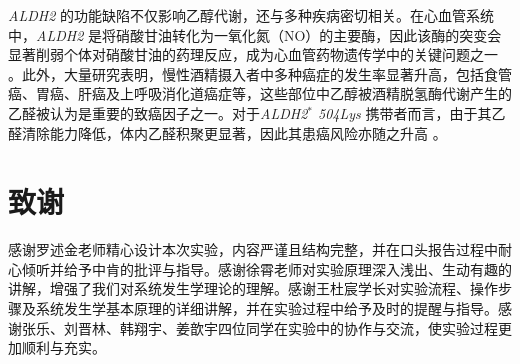 \documentclass[10pt]{article}
\begin{document}
\textit{ALDH2} 的功能缺陷不仅影响乙醇代谢，还与多种疾病密切相关。在心血管系统中，\textit{ALDH2} 是将硝酸甘油转化为一氧化氮（NO）的主要酶，因此该酶的突变会显著削弱个体对硝酸甘油的药理反应，成为心血管药物遗传学中的关键问题之一 \citep{liMitochondrialAldehydeDehydrogenase22006}。此外，大量研究表明，慢性酒精摄入者中多种癌症的发生率显著升高，包括食管癌、胃癌、肝癌及上呼吸消化道癌症等，这些部位中乙醇被酒精脱氢酶代谢产生的乙醛被认为是重要的致癌因子之一。对于\textit{ALDH2$^*$ 504Lys} 携带者而言，由于其乙醛清除能力降低，体内乙醛积聚更显著，因此其患癌风险亦随之升高 \citep{yokoyamaAlcoholAldehydeDehydrogenase2001}。




\section{致谢}

感谢罗述金老师精心设计本次实验，内容严谨且结构完整，并在口头报告过程中耐心倾听并给予中肯的批评与指导。感谢徐霄老师对实验原理深入浅出、生动有趣的讲解，增强了我们对系统发生学理论的理解。感谢王杜宸学长对实验流程、操作步骤及系统发生学基本原理的详细讲解，并在实验过程中给予及时的提醒与指导。感谢张乐、刘晋林、韩翔宇、姜歆宇四位同学在实验中的协作与交流，使实验过程更加顺利与充实。

\clearpage



\end{document}

